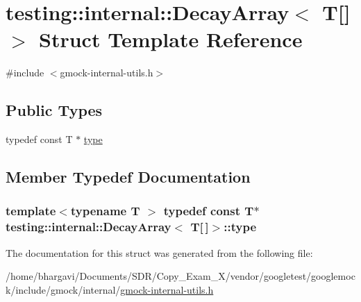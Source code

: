 \hypertarget{structtesting_1_1internal_1_1_decay_array_3_01_t[]_4}{}\section{testing\+:\+:internal\+:\+:Decay\+Array$<$ T\mbox{[}\mbox{]}$>$ Struct Template Reference}
\label{structtesting_1_1internal_1_1_decay_array_3_01_t[]_4}


{\ttfamily \#include $<$gmock-\/internal-\/utils.\+h$>$}

\subsection*{Public Types}
\begin{DoxyCompactItemize}
\item 
typedef const T $\ast$ \hyperlink{structtesting_1_1internal_1_1_decay_array_3_01_t[]_4_a1820b673d104b3a985faaef8db5d77d2}{type}
\end{DoxyCompactItemize}


\subsection{Member Typedef Documentation}
\subsubsection[{\texorpdfstring{type}{type}}]{\setlength{\rightskip}{0pt plus 5cm}template$<$typename T $>$ typedef const T$\ast$ {\bf testing\+::internal\+::\+Decay\+Array}$<$ T\mbox{[}$\,$\mbox{]}$>$\+::{\bf type}}\hypertarget{structtesting_1_1internal_1_1_decay_array_3_01_t[]_4_a1820b673d104b3a985faaef8db5d77d2}{}\label{structtesting_1_1internal_1_1_decay_array_3_01_t[]_4_a1820b673d104b3a985faaef8db5d77d2}


The documentation for this struct was generated from the following file\+:\begin{DoxyCompactItemize}
\item 
/home/bhargavi/\+Documents/\+S\+D\+R/\+Copy\+\_\+\+Exam\+\_\+X/vendor/googletest/googlemock/include/gmock/internal/\hyperlink{gmock-internal-utils_8h}{gmock-\/internal-\/utils.\+h}\end{DoxyCompactItemize}
